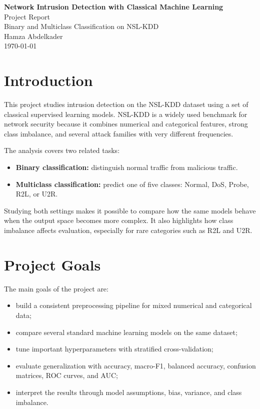 \documentclass[12pt,a4paper]{article}
\begin{document}

\begin{titlepage}
    \centering

    {\Huge \textbf{Network Intrusion Detection with Classical Machine Learning}}\\[0.8cm]
    {\Large Project Report}\\[0.4cm]
    {\large Binary and Multiclass Classification on NSL-KDD}\\[3cm]

    {\large Hamza Abdelkader}\\[4cm]

    {\large \today}
\end{titlepage}

\clearpage
{}

\section{Introduction}

This project studies intrusion detection on the NSL-KDD dataset using a set of classical supervised learning models. NSL-KDD is a widely used benchmark for network security because it combines numerical and categorical features, strong class imbalance, and several attack families with very different frequencies.

The analysis covers two related tasks:
\begin{itemize}
    \item \textbf{Binary classification:} distinguish normal traffic from malicious traffic.
    \item \textbf{Multiclass classification:} predict one of five classes: Normal, DoS, Probe, R2L, or U2R.
\end{itemize}

Studying both settings makes it possible to compare how the same models behave when the output space becomes more complex. It also highlights how class imbalance affects evaluation, especially for rare categories such as R2L and U2R.

\section{Project Goals}

The main goals of the project are:
\begin{itemize}
    \item build a consistent preprocessing pipeline for mixed numerical and categorical data;
    \item compare several standard machine learning models on the same dataset;
    \item tune important hyperparameters with stratified cross-validation;
    \item evaluate generalization with accuracy, macro-F1, balanced accuracy, confusion matrices, ROC curves, and AUC;
    \item interpret the results through model assumptions, bias, variance, and class imbalance.
\end{itemize}
\end{document}
